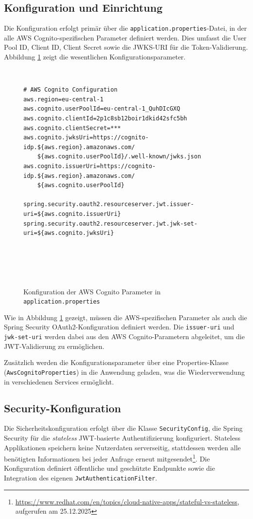 \subsection{Konfiguration und Einrichtung}

Die Konfiguration erfolgt primär über die \texttt{application.properties}-Datei, in der alle \ac{AWS} Cognito-spezifischen Parameter definiert werden. Dies umfasst die User Pool ID, Client ID, Client Secret sowie die \ac{JWKS}-\ac{URI} für die Token-Validierung. Abbildung \ref{fig:spring_properties} zeigt die wesentlichen Konfigurationsparameter.

\begin{figure}[h]
    \begin{verbatim}
# AWS Cognito Configuration
aws.region=eu-central-1
aws.cognito.userPoolId=eu-central-1_QuhDIcGXQ
aws.cognito.clientId=2p1c8sb12boir1dkid42sfc5bh
aws.cognito.clientSecret=***
aws.cognito.jwksUri=https://cognito-idp.${aws.region}.amazonaws.com/
    ${aws.cognito.userPoolId}/.well-known/jwks.json
aws.cognito.issuerUri=https://cognito-idp.${aws.region}.amazonaws.com/
    ${aws.cognito.userPoolId}

spring.security.oauth2.resourceserver.jwt.issuer-uri=${aws.cognito.issuerUri}
spring.security.oauth2.resourceserver.jwt.jwk-set-uri=${aws.cognito.jwksUri}
    \end{verbatim}
    \caption{Konfiguration der AWS Cognito Parameter in \texttt{application.properties}}
    \label{fig:spring_properties}
\end{figure}

Wie in Abbildung \ref{fig:spring_properties} gezeigt, müssen die \ac{AWS}-spezifischen Parameter als auch die Spring Security OAuth2-Konfiguration definiert werden. Die \texttt{issuer-uri} und \texttt{jwk-set-uri} werden dabei aus den \ac{AWS} Cognito-Parametern abgeleitet, um die \ac{JWT}-Validierung zu ermöglichen.

Zusätzlich werden die Konfigurationsparameter über eine Properties-Klasse (\texttt{AwsCognitoProperties}) in die Anwendung geladen, was die Wiederverwendung in verschiedenen Services ermöglicht.

\subsection{Security-Konfiguration}

Die Sicherheitskonfiguration erfolgt über die Klasse \texttt{SecurityConfig}, die Spring Security für die \textit{stateless} \ac{JWT}-basierte Authentifizierung konfiguriert. Stateless Applikationen speichern keine Nutzerdaten serverseitig, stattdessen werden alle benötigten Informationen bei jeder Anfrage erneut mitgesendet\footnote{\url{https://www.redhat.com/en/topics/cloud-native-apps/stateful-vs-stateless}, aufgerufen am 25.12.2025}. Die Konfiguration definiert öffentliche und geschützte Endpunkte sowie die Integration des eigenen \texttt{JwtAuthenticationFilter}.

